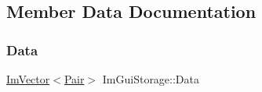 \subsection{Member Data Documentation}
\hypertarget{struct_im_gui_storage_aab0b9789fac598a34c500459259fde42}{}\label{struct_im_gui_storage_aab0b9789fac598a34c500459259fde42} 
\subsubsection{\texorpdfstring{Data}{Data}}
{\footnotesize\ttfamily \hyperlink{class_im_vector}{Im\+Vector}$<$\hyperlink{struct_im_gui_storage_1_1_pair}{Pair}$>$ Im\+Gui\+Storage\+::\+Data}

